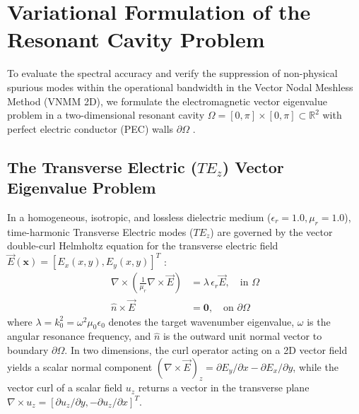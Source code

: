\documentclass[preprint,12pt]{elsarticle}
\begin{document}
\section{Variational Formulation of the Resonant Cavity Problem}
\label{sec:variational_formulation}

To evaluate the spectral accuracy and verify the suppression of non-physical spurious modes within the operational bandwidth in the Vector Nodal Meshless Method (VNMM 2D), we formulate the electromagnetic vector eigenvalue problem in a two-dimensional resonant cavity $\Omega = [0, \pi] \times [0, \pi] \subset \mathbb{R}^2$ with perfect electric conductor (PEC) walls $\partial\Omega$ \cite{harrington2001time}.

\subsection{The Transverse Electric (\texorpdfstring{$TE_z$}{TEz}) Vector Eigenvalue Problem}
\label{subsec:strong_form}

In a homogeneous, isotropic, and lossless dielectric medium ($\epsilon_r = 1.0, \mu_r = 1.0$), time-harmonic Transverse Electric modes ($TE_z$) are governed by the vector double-curl Helmholtz equation for the transverse electric field $\vec{E}(\mathbf{x}) = [E_x(x,y), E_y(x,y)]^T$ \cite{monk2003finite, ortiz2023tese}:
\begin{align}
\nabla \times \left( \frac{1}{\mu_r} \nabla \times \vec{E} \right) &= \lambda \, \epsilon_r \vec{E}, \quad \text{in } \Omega \label{eq:helmholtz_strong} \\
\hat{n} \times \vec{E} &= \mathbf{0}, \quad \text{on } \partial\Omega \label{eq:pec_boundary}
\end{align}
where $\lambda = k_0^2 = \omega^2 \mu_0 \epsilon_0$ denotes the target wavenumber eigenvalue, $\omega$ is the angular resonance frequency, and $\hat{n}$ is the outward unit normal vector to boundary $\partial\Omega$. In two dimensions, the curl operator acting on a 2D vector field yields a scalar normal component $(\nabla \times \vec{E})_z = \partial E_y/\partial x - \partial E_x/\partial y$, while the vector curl of a scalar field $u_z$ returns a vector in the transverse plane $\nabla \times u_z = [\partial u_z/\partial y, -\partial u_z/\partial x]^T$.
\end{document}
